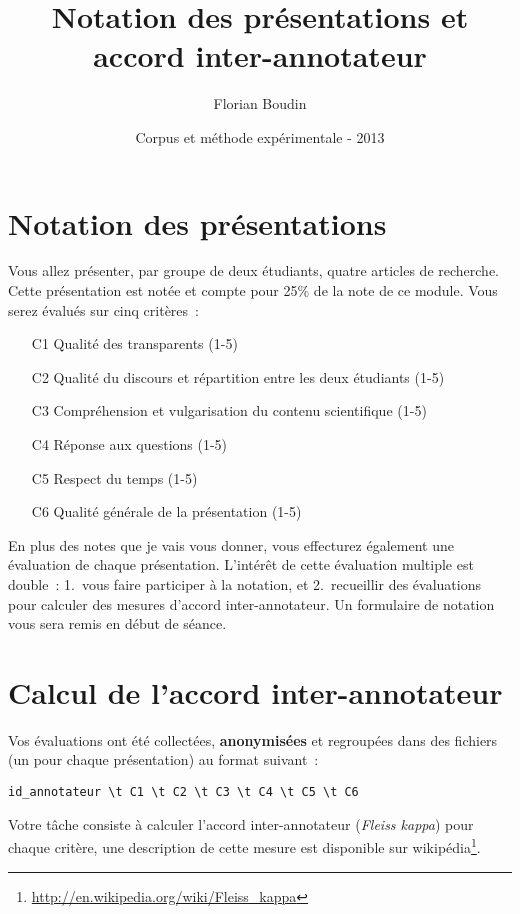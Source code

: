 \documentclass[12pt,a4paper]{article}
\begin{document}
\title{Notation des présentations et accord inter-annotateur}
\author{Florian Boudin}
\date{Corpus et méthode expérimentale - 2013}

\maketitle

\section*{Notation des présentations}

Vous allez présenter, par groupe de deux étudiants, quatre articles de recherche.
Cette présentation est notée et compte pour 25\% de la note de ce module.
Vous serez évalués sur cinq critères~:

\begin{enumerate}
    \item[C1] Qualité des transparents (1-5)
    \item[C2] Qualité du discours et répartition entre les deux étudiants (1-5)
    \item[C3] Compréhension et vulgarisation du contenu scientifique (1-5)
    \item[C4] Réponse aux questions (1-5)
    \item[C5] Respect du temps (1-5)
    \item[C6] Qualité générale de la présentation (1-5)
\end{enumerate}

En plus des notes que je vais vous donner, vous effecturez également une évaluation de chaque présentation.
L'intérêt de cette évaluation multiple est double~: 1.~vous faire participer à la notation, et 2.~recueillir des évaluations pour calculer des mesures d'accord inter-annotateur.
Un formulaire de notation vous sera remis en début de séance.

\section*{Calcul de l'accord inter-annotateur}

Vos évaluations ont été collectées, \textbf{anonymisées} et regroupées dans des fichiers (un pour chaque présentation) au format suivant~:

\begin{verbatim}
id_annotateur \t C1 \t C2 \t C3 \t C4 \t C5 \t C6
\end{verbatim}

Votre tâche consiste à calculer l'accord inter-annotateur (\textit{Fleiss kappa}) pour chaque critère, une description de cette mesure est disponible sur wikipédia\footnote{\url{http://en.wikipedia.org/wiki/Fleiss_kappa}}.
\end{document}
